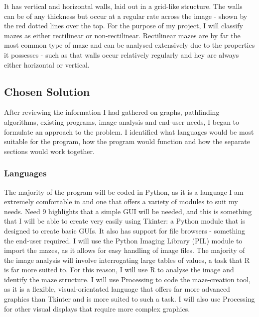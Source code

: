 \documentclass[titlepage]{article}
\begin{document}
It has vertical and horizontal walls, laid out in a grid-like structure. The walls can be of any thickness but occur at a regular rate across the image - shown by the red dotted lines over the top. For the purpose of my project, I will classify mazes as either rectilinear or non-rectilinear. Rectilinear mazes are by far the most common type of maze and can be analysed extensively due to the properties it possesses - such as that walls occur relatively regularly and hey are always either horizontal or vertical.

\subsection{Chosen Solution}
After reviewing the information I had gathered on graphs, pathfinding algorithms, existing programs, image analysis and end-user needs, I began to formulate an approach to the problem. I identified what languages would be most suitable for the program, how the program would function and how the separate sections would work together.

\subsubsection{Languages}
The majority of the program will be coded in Python, as it is a language I am extremely comfortable in and one that offers a variety of modules to suit my needs. Need 9 highlights that a simple GUI will be needed, and this is something that I will be able to create very easily using Tkinter: a Python module that is designed to create basic GUIs. It also has support for file browsers - something the end-user required. I will use the Python Imaging Library (PIL) module to import the mazes, as it allows for easy handling of image files. The majority of the image analysis will involve interrogating large tables of values, a task that R is far more suited to. For this reason, I will use R to analyse the image and identify the maze structure. I will use Processing to code the maze-creation tool, as it is a flexible, visual-orientated language that offers far more advanced graphics than Tkinter and is more suited to such a task. I will also use Processing for other visual displays that require more complex graphics.
\end{document}

